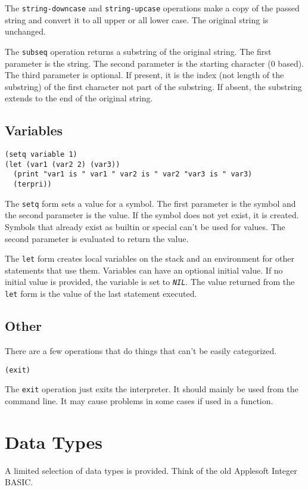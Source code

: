 \documentclass[10pt, openany]{book}
\newcommand{\function}[1]{\texttt{#1}}
\newcommand{\constant}[1]{\emph{\texttt{#1}}}
\begin{document}
The \function{string-downcase} and \function{string-upcase} operations make a copy of the passed string and convert it to all upper or all lower case.  The original string is unchanged.

The \function{subseq} operation returns a substring of the original string.  The first parameter is the string.  The second parameter is the starting character (0 based).  The third parameter is optional.  If present, it is the index (not length of the substring) of the first character  not part of the substring.  If absent, the substring extends to the end of the original string.

\subsection{Variables}

\begin{lstlisting}
(setq variable 1)
(let (var1 (var2 2) (var3))
  (print "var1 is " var1 " var2 is " var2 "var3 is " var3)
  (terpri))
\end{lstlisting}

The \function{setq} form sets a value for a symbol.  The first parameter is the symbol and the second parameter is the value.  If the symbol does not yet exist, it is created.  Symbols that already exist as builtin or special can't be used for values.  The second parameter is evaluated to return the value.

The \function{let} form creates local variables on the stack and an environment for other statements that use them.  Variables can have an optional initial value.  If no initial value is provided, the variable is set to \constant{NIL}.  The value returned from the \function{let} form is the value of the last statement executed.

\subsection{Other}
There are a few operations that do things that can't be easily categorized.

\begin{lstlisting}
(exit)
\end{lstlisting}

The \function{exit} operation just exits the interpreter.  It should mainly be used from the command line.  It may cause problems in some cases if used in a function.

\section{Data Types}
A limited selection of data types is provided.  Think of the old Applesoft Integer BASIC.
\end{document}
